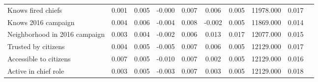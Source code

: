 {\begin{tabular}{l*{9}{c}}
Knows fired chiefs & 0.001 & 0.005 & -0.000 & 0.007 & 0.006 & 0.005 & 11978.000 & 0.017 \\
Knows 2016 campaign & 0.004 & 0.006 & -0.004 & 0.008 & -0.002 & 0.005 & 11869.000 & 0.014 \\
Neighborhood in 2016 campaign & 0.003 & 0.004 & -0.002 & 0.006 & 0.013 & 0.017 & 12077.000 & 0.015 \\
Trusted by citizens & 0.004 & 0.005 & -0.005 & 0.007 & 0.006 & 0.005 & 12129.000 & 0.017 \\
Accessible to citizens & 0.007 & 0.005 & -0.010 & 0.007 & 0.002 & 0.005 & 12129.000 & 0.016 \\
Active in chief role & 0.003 & 0.005 & -0.003 & 0.007 & 0.003 & 0.005 & 12129.000 & 0.018 \\
\hline\hline \end{tabular} }

